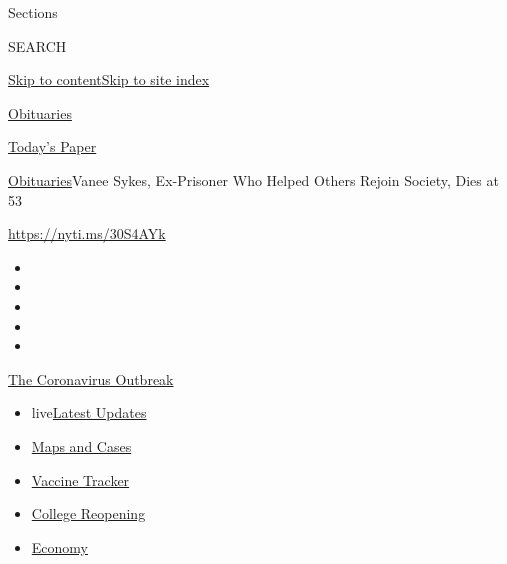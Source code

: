 Sections

SEARCH

\protect\hyperlink{site-content}{Skip to
content}\protect\hyperlink{site-index}{Skip to site index}

\href{https://www.nytimes3xbfgragh.onion/section/obituaries}{Obituaries}

\href{https://myaccount.nytimes3xbfgragh.onion/auth/login?response_type=cookie\&client_id=vi}{}

\href{https://www.nytimes3xbfgragh.onion/section/todayspaper}{Today's
Paper}

\href{/section/obituaries}{Obituaries}\textbar{}Vanee Sykes, Ex-Prisoner
Who Helped Others Rejoin Society, Dies at 53

\url{https://nyti.ms/30S4AYk}

\begin{itemize}
\item
\item
\item
\item
\item
\end{itemize}

\href{https://www.nytimes3xbfgragh.onion/news-event/coronavirus?action=click\&pgtype=Article\&state=default\&region=TOP_BANNER\&context=storylines_menu}{The
Coronavirus Outbreak}

\begin{itemize}
\tightlist
\item
  live\href{https://www.nytimes3xbfgragh.onion/2020/08/04/world/coronavirus-covid-19.html?action=click\&pgtype=Article\&state=default\&region=TOP_BANNER\&context=storylines_menu}{Latest
  Updates}
\item
  \href{https://www.nytimes3xbfgragh.onion/interactive/2020/us/coronavirus-us-cases.html?action=click\&pgtype=Article\&state=default\&region=TOP_BANNER\&context=storylines_menu}{Maps
  and Cases}
\item
  \href{https://www.nytimes3xbfgragh.onion/interactive/2020/science/coronavirus-vaccine-tracker.html?action=click\&pgtype=Article\&state=default\&region=TOP_BANNER\&context=storylines_menu}{Vaccine
  Tracker}
\item
  \href{https://www.nytimes3xbfgragh.onion/2020/08/02/us/covid-college-reopening.html?action=click\&pgtype=Article\&state=default\&region=TOP_BANNER\&context=storylines_menu}{College
  Reopening}
\item
  \href{https://www.nytimes3xbfgragh.onion/live/2020/08/03/business/stock-market-today-coronavirus?action=click\&pgtype=Article\&state=default\&region=TOP_BANNER\&context=storylines_menu}{Economy}
\end{itemize}

